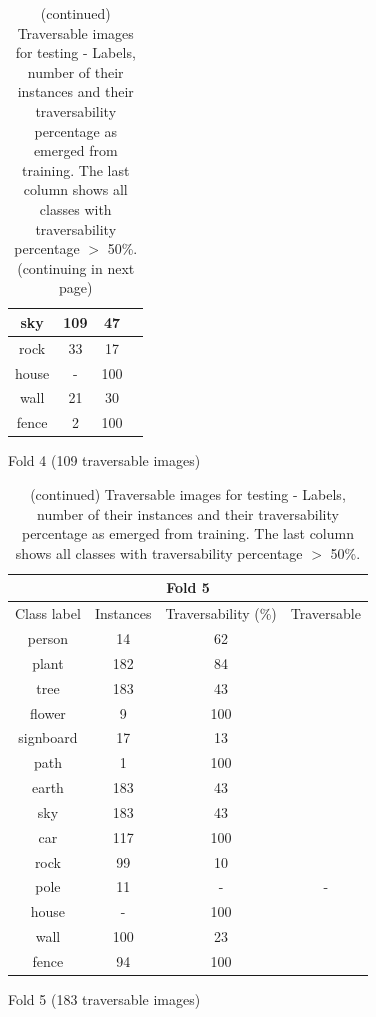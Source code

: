 \documentclass[12pt,a4paper,table,dvipsnames,tikz]{report}
\begin{document}
\begin{table}[h!]
\begin{subtable}[h!]{\textwidth}
\begin{tabular}{|c|c|c|c|}
				sky & 109 & 47 &\\
				\hline
				rock & 33 & 17 &\\
				\hline
				\rowcolor{house}
				house & - & 100 & \checkmark\\
				\hline
				wall & 21 & 30 &\\
				\hline
				fence & 2 & 100 & \checkmark\\
				\hline
			\end{tabular}
			\caption{Fold 4 (109 traversable images)}
			\label{table:trav.f4}
		\end{subtable}
		\caption{(continued) Traversable images for testing - Labels, number of their instances 
			and their traversability percentage as emerged from training. The last column shows 
			all classes with traversability percentage $>$ 50\%. (continuing in next page)}
	\end{table}
	
	\begin{table}[h!]
		\ContinuedFloat %
		\begin{subtable}[h!]{\textwidth}
			\centering
			\begin{tabular}{|c|c|c|c|}
				\hline
				\multicolumn{4}{|c|}{Fold 5}\\
				\hline
				Class label & Instances & Traversability (\%) & Traversable\\
				\hline\hline
				person & 14 & 62 & \checkmark\\
				\hline		
				plant & 182 & 84 & \checkmark\\
				\hline
				\rowcolor{tree}
				tree & 183 & 43 &\\
				\hline
				flower & 9 & 100 & \checkmark\\
				\hline
				signboard & 17 & 13 &\\
				\hline
				path & 1 & 100 & \checkmark\\
				\hline
				\rowcolor{earth}
				earth & 183 & 43 &\\
				\hline
				\rowcolor{sky}
				sky & 183 & 43 &\\
				\hline
				car & 117 & 100 & \checkmark\\
				\hline
				rock & 99 & 10 &\\
				\hline
				pole & 11 & - & -\\
				\hline
				\rowcolor{house}
				house & - & 100 & \checkmark\\
				\hline
				wall & 100 & 23 &\\
				\hline
				fence & 94 & 100 & \checkmark\\
				\hline
			\end{tabular}
			\caption{Fold 5 (183 traversable images)}
			\label{table:trav.f5}
		\end{subtable}
		\caption{(continued) Traversable images for testing - Labels, number of their instances 
			and their traversability percentage as emerged from training. The last column shows 
			all classes with traversability percentage $>$ 50\%.}
	\end{table}
	
\end{document}

